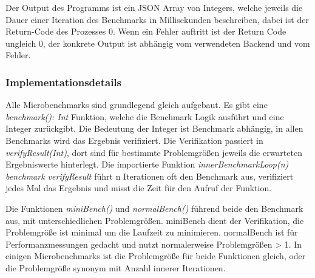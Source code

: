 Der Output des Programms ist ein JSON Array von Integers, welche jeweils die Dauer einer Iteration des Benchmarks in Millisekunden beschreiben, dabei ist der Return-Code des Prozesses 0.
Wenn ein Fehler auftritt ist der Return Code ungleich 0, der konkrete Output ist abhängig vom verwendeten Backend und vom Fehler. 

\subsubsection{Implementationsdetails}
Alle Microbenchmarks sind grundlegend gleich aufgebaut.
Es gibt eine \textit{benchmark(): Int} Funktion, welche die Benchmark Logik ausführt und eine Integer zurückgibt. Die Bedeutung der Integer ist Benchmark abhängig, in allen Benchmarks wird das Ergebnis verifiziert. Die Verifikation passiert in \textit{verifyResult(Int)}, dort sind für bestimmte Problemgrößen jeweils die erwarteten Ergebniswerte hinterlegt.
Die importierte Funktion \textit{innerBenchmarkLoop(n){ benchmark }{ verifyResult }} führt n Iterationen oft den Benchmark aus, verifiziert jedes Mal das Ergebnis und misst die Zeit für den Aufruf der Funktion.


Die Funktionen \textit{miniBench()} und \textit{normalBench()} führend beide den Benchmark aus, mit unterschiedlichen Problemgrößen. miniBench dient der Verifikation, die Problemgröße ist minimal um die Laufzeit zu minimieren.
normalBench ist für Performanzmessungen gedacht und nutzt normalerweise Problemgrößen > 1. In einigen Microbenchmarks ist die Problemgröße für beide Funktionen gleich, oder die Problemgröße synonym mit Anzahl innerer Iterationen.

